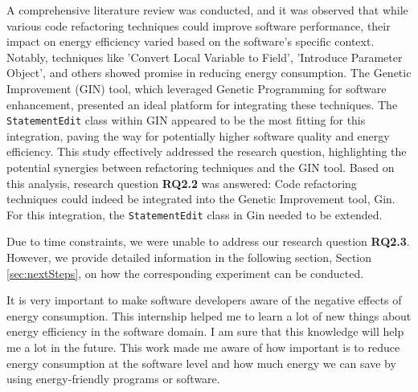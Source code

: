 \vspace{.5em}
A comprehensive literature review was conducted, and it was observed that while various code refactoring techniques could improve software performance, their impact on energy efficiency varied based on the software's specific context. Notably, techniques like 'Convert Local Variable to Field', 'Introduce Parameter Object', and others showed promise in reducing energy consumption. The Genetic Improvement (GIN) tool, which leveraged Genetic Programming for software enhancement, presented an ideal platform for integrating these techniques. The \texttt{StatementEdit} class within GIN appeared to be the most fitting for this integration, paving the way for potentially higher software quality and energy efficiency. This study effectively addressed the research question, highlighting the potential synergies between refactoring techniques and the GIN tool. Based on this analysis, research question \textbf{RQ2.2} was answered: Code refactoring techniques could indeed be integrated into the Genetic Improvement tool, Gin. For this integration, the \texttt{StatementEdit} class in Gin needed to be extended.

\vspace{.5em}
Due to time constraints, we were unable to address our research question \textbf{RQ2.3}. However, we provide detailed information in the following section, Section \ref{sec:nextSteps}, on how the corresponding experiment can be conducted.

\vspace{.5em}
It is very important to make software developers aware of the negative effects of energy consumption. This internship helped me to learn a lot of new things about energy efficiency in the software domain. I am sure that this knowledge will help me a lot in the future. This work made me aware of how important is to reduce energy consumption at the software level and how much energy we can save by using energy-friendly programs or software.







